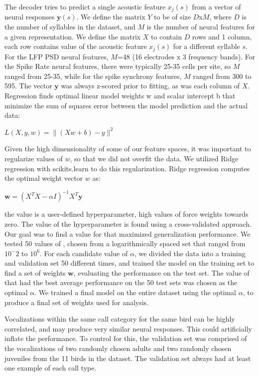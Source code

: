 The decoder tries to predict a single acoustic feature $x_j (s)$ from a vector of neural responses $\textbf{y}(s)$. We define the matrix $Y$ to be of size $D$x$M$, where $D$ is the number of syllables in the dataset, and $M$ is the number of neural features for a given representation. We define the matrix $X$ to contain $D$ rows and 1 column, each row contains value of the acoustic feature $x_j(s)$ for a different syllable $s$. For the LFP PSD neural features, $M$=48 (16 electrodes x 3 frequency bands). For the Spike Rate neural features, there were typically 25-35 cells per site, so $M$ ranged from 25-35, while for the spike synchrony features, $M$ ranged from 300 to 595. The vector $\textbf{y}$ was always z-scored prior to fitting, as was each column of $X$.
    Regression finds optimal linear model weights w and scalar intercept b that minimize the sum of squares error between the model prediction and the actual data:

\begin{center}
$L(X, y, w) = \| (Xw + b) - y \| ^2$
\end{center}

Given the high dimensionality of some of our feature spaces, it was important to regularize values of $w$, so that we did not overfit the data. We utilized Ridge regression with scikits.learn to do this regularization. Ridge regression computes the optimal weight vector $w$ as:

\begin{center}
$\textbf{w} = (X^T X - \alpha I)^{-1} X^T \textbf{y}$
\end{center}

the value is a user-defined hyperparameter, high values of force weights towards zero.
The value of the hyperparameter  is found using a cross-validated approach. Our goal was to find a value for that maximized generalization performance. We tested 50 values of , chosen from a logarithmically spaced set that ranged from $10^-2$ to $10^6$. For each candidate value of $\alpha$, we divided the data into a training and validation set 50 different times, and trained the model on the training set to find a set of weights $\textbf{w}$, evaluating the performance on the test set. The value of  that had the best average performance on the 50 test sets was chosen as the optimal $\alpha$. We trained a final model on the entire dataset using the optimal $\alpha$, to produce a final set of weights used for analysis.

Vocalizations within the same call category for the same bird can be highly correlated, and may produce very similar neural responses. This could artificially inflate the performance. To control for this, the validation set was comprised of the vocalizations of two randomly chosen adults and two randomly chosen juveniles from the 11 birds in the dataset. The validation set always had at least one example of each call type.


